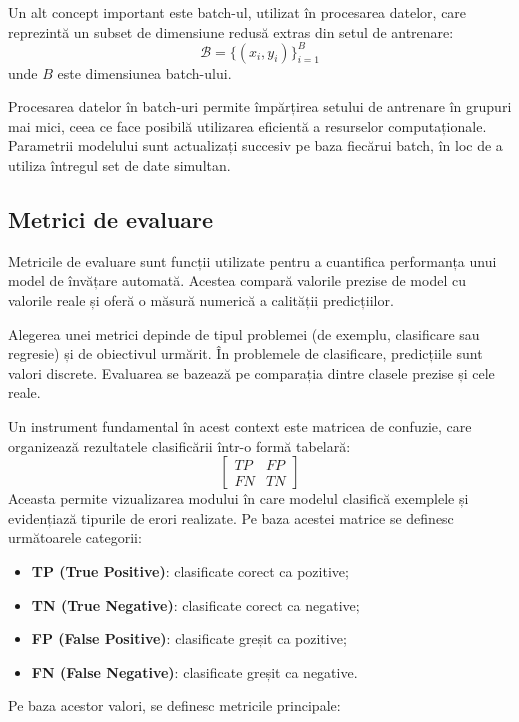 Un alt concept important este batch-ul, utilizat în procesarea datelor, care reprezintă un subset de dimensiune redusă extras din setul de antrenare:
\[
    \mathcal{B} = \{(x_i, y_i)\}_{i=1}^{B}
\]
unde \(B\) este dimensiunea batch-ului.

Procesarea datelor în batch-uri permite împărțirea setului de antrenare în grupuri mai mici, ceea ce face posibilă utilizarea eficientă a resurselor computaționale. Parametrii modelului sunt actualizați succesiv pe baza fiecărui batch, în loc de a utiliza întregul set de date simultan.

\subsection*{Metrici de evaluare}

Metricile de evaluare sunt funcții utilizate pentru a cuantifica performanța unui model de învățare automată. Acestea compară valorile prezise de model cu valorile reale și oferă o măsură numerică a calității predicțiilor.

Alegerea unei metrici depinde de tipul problemei (de exemplu, clasificare sau regresie) și de obiectivul urmărit. În problemele de clasificare, predicțiile sunt valori discrete. Evaluarea se bazează pe comparația dintre clasele prezise și cele reale.

Un instrument fundamental în acest context este matricea de confuzie, care organizează rezultatele clasificării într-o formă tabelară:
\[
    \begin{bmatrix}
        TP & FP \\
        FN & TN
    \end{bmatrix}
\]
Aceasta permite vizualizarea modului în care modelul clasifică exemplele și evidențiază tipurile de erori realizate. Pe baza acestei matrice se definesc următoarele categorii:

\begin{itemize}
    \item \textbf{TP (True Positive)}: clasificate corect ca pozitive;
    \item \textbf{TN (True Negative)}: clasificate corect ca negative;
    \item \textbf{FP (False Positive)}: clasificate greșit ca pozitive;
    \item \textbf{FN (False Negative)}: clasificate greșit ca negative.
\end{itemize}

Pe baza acestor valori, se definesc metricile principale:

